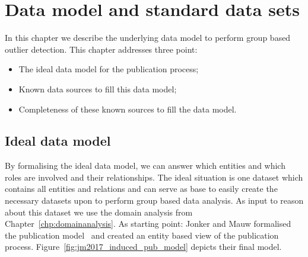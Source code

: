 \documentclass{ou-report}
\begin{document}








\chapter{Data model and standard data sets}
\label{chp:data}
In this chapter we describe the underlying data model to perform group based 
outlier detection. This chapter addresses three point:
\begin{itemize}
    \item The ideal data model for the publication process;
    \item Known data sources to fill this data model;
    \item Completeness of these known sources to fill the data model.
\end{itemize}


\section{Ideal data model}
By formalising the ideal data model, we can answer which entities and which 
roles are involved and their relationships.
The ideal situation is one dataset which contains all entities and relations 
and can serve as base to easily create the necessary datasets upon to perform 
group based data analysis. As 
input to reason about this dataset we use the domain analysis from 
Chapter~\ref{chp:domainanalysis}.
As starting point: Jonker and Mauw formalised the publication
model~\cite{JM2017} 
and created an entity based view of the publication process. 
Figure~\ref{fig:jm2017_induced_pub_model} depicts their final model.
\end{document}
